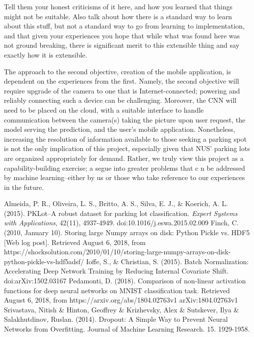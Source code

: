 \documentclass[a4paper, 11pt]{article} %
\begin{document}
	Tell them your honest criticisms of it here, and how you learned that things
	might not be suitable.
	Also talk about how there is a standard way to learn about this stuff, but
	not a standard way to go from learning to implementation, and that given your
	experiences you hope that while what was found here was not ground breaking,
	there is significant merit to this extensible thing and say exactly how it is
	extensible.

	The approach to the second objective, creation of the mobile application, is
	dependent on the experiences from the first. Namely, the second objective will
	require upgrade of the camera to one that is Internet-connected; powering and
	reliably connecting such a device can be challenging.  Moreover, the CNN will
	need to be placed on the cloud, with a suitable interface to handle
	communication between the camera(s) taking the picture upon user request, the
	 model serving the prediction, and the user's mobile application.
	  Nonetheless, increasing the
	resolution of information available to those seeking a parking spot is not the
	only implication of this project, especially given that NUS' parking lots are
	organized appropriately for demand. Rather, we truly view this project as a
	capability-building exercise; a segue into greater problems that c n be
	addressed by machine learning--either by us or those who take reference to our
	experiences in the future.

\newpage
\begin{thebibliography}{unsrt}
		Almeida, P. R., Oliveira, L. S., Britto, A. S., Silva, E. J., \& Koerich, A. L. (2015). PKLot--A robust 
		dataset for parking lot classification. \textit{Expert Systems with Applications}, 42(11), 
		4937-4949. doi:10.1016/j.eswa.2015.02.009
		Finch, C. (2010, January 10). Storing large Numpy arrays on disk: 
		Python Pickle vs. HDF5 [Web log post]. Retrieved August 6, 2018, from 
		https://shocksolution.com/2010/01/10/storing-large-numpy-arrays-on-disk-python-pickle-vs-hdf5adsf/
		Ioffe, S., \& Christian, S. (2015). Batch Normalization: Accelerating 
		Deep Network Training by Reducing Internal Covariate Shift. 
		doi:arXiv:1502.03167
		Pedamonti, D. (2018). Comparison of non-linear activation functions for 
		deep neural networks on MNIST classification task. Retrieved August 6, 
		2018, from https://arxiv.org/abs/1804.02763v1 arXiv:1804.02763v1
		Srivastava, Nitish \& Hinton, Geoffrey \& Krizhevsky, Alex \& 
		Sutskever, Ilya \& Salakhutdinov, Ruslan. (2014). Dropout: A Simple Way 
		to Prevent Neural Networks from Overfitting. Journal of Machine 
		Learning Research. 15. 1929-1958.
\end{thebibliography}
\end{document}
